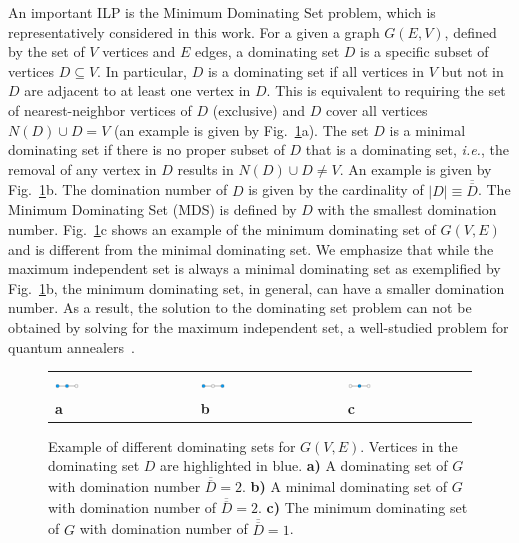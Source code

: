 \documentclass[prd,twocolumn,tightenlines,preprintnumbers,showpacs,superscriptaddress,notitlepage,nofootinbib,eqsecnum,floatfix,longbibliography,aps,10pt]{revtex4-2}
\begin{document}
An important ILP is the Minimum Dominating Set problem, which is representatively considered in this work.
For a given a graph $G(E,V)$, defined by the set of $V$ vertices and $E$ edges, a dominating set $D$ is a specific subset of vertices $D \subseteq V$.
In particular, $D$ is a dominating set if all vertices in $V$ but not in $D$ are adjacent to at least one vertex in $D$.
This is equivalent to requiring the set of nearest-neighbor vertices of $D$ (exclusive) and $D$ cover all vertices $N(D) \cup D = V$ (an example is given by Fig.~\ref{fig:dominating_sets}a).
The set $D$ is a minimal dominating set if there is no proper subset of $D$ that is a dominating set, {\it{i.e.}}, the removal of any vertex in $D$ results in $N(D) \cup D  \neq V$.
An example is given by Fig.~\ref{fig:dominating_sets}b.
The domination number of $D$ is given by the cardinality of $|D| \equiv \overline{\overline{D}}$.
The Minimum Dominating Set (MDS) is defined by $D$ with the smallest domination number.
Fig.~\ref{fig:dominating_sets}c shows an example of the minimum dominating set of $G(V, E)$ and is different from the minimal dominating set.
We emphasize that while the maximum independent set is always a minimal dominating set as exemplified by Fig.~\ref{fig:dominating_sets}b, the minimum dominating set, in general, can have a smaller domination number.
As a result, the solution to the dominating set problem can not be obtained by solving for the maximum independent set, a well-studied problem for quantum annealers~\cite{}.

\begin{figure}
	\centering
	\begin{tabular}{p{}p{}p{}p{}p{}}
	\includegraphics[width=0.2\textwidth]{./new_figures/MDS_mds0.pdf}
&&
	\includegraphics[width=0.2\textwidth]{./new_figures/MDS_mds1.pdf}
&&
	\includegraphics[width=0.2\textwidth]{./new_figures/MDS_mds2.pdf}\\
	\centering\bf{a} && \centering\bf{b} && \centering\bf{c}
	\end{tabular}
	\caption{Example of different dominating sets for $G(V, E)$. Vertices in the dominating set $D$ are highlighted in blue. {\bf{a)}} A dominating set of $G$ with domination number $\overline{\overline{D}} = 2$. {\bf{b)}} A minimal dominating set of $G$ with domination number of $\overline{\overline{D}} = 2$. {\bf{c)}} The minimum dominating set of $G$ with domination number of $\overline{\overline{D}} = 1$.}
	\label{fig:dominating_sets}
\end{figure}
\end{document}
